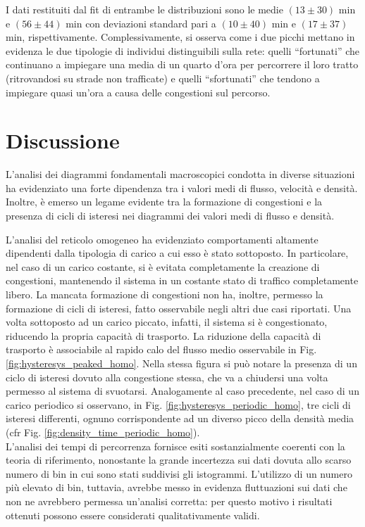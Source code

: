 \documentclass[../main.tex]{subfiles}
\begin{document}
I dati restituiti dal fit di entrambe le distribuzioni sono le medie $(13 \pm 30)$ min e $(56 \pm 44)$ min con deviazioni standard pari a $(10 \pm 40)$ min e $(17 \pm 37)$ min, rispettivamente.
Complessivamente, si osserva come i due picchi mettano in evidenza le due tipologie di individui distinguibili sulla rete: quelli ``fortunati'' che continuano a impiegare una media di un quarto d'ora per percorrere il loro tratto (ritrovandosi su strade non trafficate) e quelli ``sfortunati'' che tendono a impiegare quasi un'ora a causa delle congestioni sul percorso.

\section{Discussione}
L'analisi dei diagrammi fondamentali macroscopici condotta in diverse situazioni ha evidenziato una forte dipendenza tra i valori medi di flusso, velocit\`a e densit\`a.
Inoltre, \`e emerso un legame evidente tra la formazione di congestioni e la presenza di cicli di isteresi nei diagrammi dei valori medi di flusso e densit\`a.


L'analisi del reticolo omogeneo ha evidenziato comportamenti altamente dipendenti dalla tipologia di carico a cui esso \`e stato sottoposto.
In particolare, nel caso di un carico costante, si \`e evitata completamente la creazione di congestioni, mantenendo il sistema in un costante stato di traffico completamente libero.
La mancata formazione di congestioni non ha, inoltre, permesso la formazione di cicli di isteresi, fatto osservabile negli altri due casi riportati.
Una volta sottoposto ad un carico piccato, infatti, il sistema si \`e congestionato, riducendo la propria capacit\`a di trasporto.
La riduzione della capacit\`a di trasporto \`e associabile al rapido calo del flusso medio osservabile in Fig. \ref{fig:hysteresys_peaked_homo}.
Nella stessa figura si pu\`o notare la presenza di un ciclo di isteresi dovuto alla congestione stessa, che va a chiudersi una volta permesso al sistema di svuotarsi.
Analogamente al caso precedente, nel caso di un carico periodico si osservano, in Fig. \ref{fig:hysteresys_periodic_homo}, tre cicli di isteresi differenti, ognuno corrispondente ad un diverso picco della densit\`a media (cfr Fig. \ref{fig:density_time_periodic_homo}).\\
L'analisi dei tempi di percorrenza fornisce esiti sostanzialmente coerenti con la teoria di riferimento, nonostante la grande incertezza sui dati dovuta allo scarso numero di bin in cui sono stati suddivisi gli istogrammi.
L'utilizzo di un numero pi\`u elevato di bin, tuttavia, avrebbe messo in evidenza fluttuazioni sui dati che non ne avrebbero permessa un'analisi corretta: per questo motivo i risultati ottenuti possono essere considerati qualitativamente validi.
\end{document}
